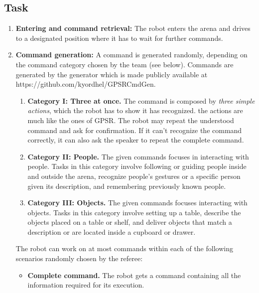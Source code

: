 \subsection{Task}

\begin{enumerate}
	\item \textbf{Entering and command retrieval:} The robot enters the arena and drives to a designated position where it has to wait for further commands. \\

	\item \textbf{Command generation:} A command is generated randomly, depending on the command category chosen by the team (see below). Commands are generated by the generator which is made publicly available at https://github.com/kyordhel/GPSRCmdGen. \\

	\begin{enumerate}
		\item \textbf{Category I: Three at once.} The command is composed by \textit{three simple actions}, which the robot has to show it has recognized. the actions are much like the ones of GPSR. The robot may repeat the understood command and ask for confirmation. If it can't recognize the command correctly, it can also ask the speaker to repeat the complete command.

		\item \textbf{Category II: People.} The given commands focuses in interacting with people. Tasks in this category involve following or guiding people inside and outside the arena, recognize people's gestures or a specific person given its description, and remembering previously known people.

		\item \textbf{Category III: Objects.} The given commands focuses interacting with objects. Tasks in this category involve setting up a table, describe the objects placed on a table or shelf, and deliver objects that match a description or are located inside a cupboard or drawer.
	\end{enumerate}

	The robot can work on at most \eegpsrMaxCmd commands within each of the following scenarios randomly chosen by the referee: \\

	\begin{itemize}
		\item \textbf{Complete command.} The robot gets a command containing all the information required for its execution.


\end{itemize}
\end{enumerate}
